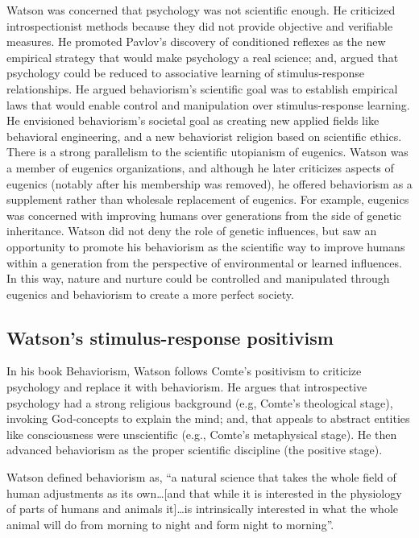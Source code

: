 \documentclass[
  oneside,
  12pt]{crumpbook}
\begin{document}
Watson was concerned that psychology was not scientific enough. He criticized introspectionist methods because they did not provide objective and verifiable measures. He promoted Pavlov's discovery of conditioned reflexes as the new empirical strategy that would make psychology a real science; and, argued that psychology could be reduced to associative learning of stimulus-response relationships. He argued behaviorism's scientific goal was to establish empirical laws that would enable control and manipulation over stimulus-response learning. He envisioned behaviorism's societal goal as creating new applied fields like behavioral engineering, and a new behaviorist religion based on scientific ethics. There is a strong parallelism to the scientific utopianism of eugenics. Watson was a member of eugenics organizations, and although he later criticizes aspects of eugenics (notably after his membership was removed), he offered behaviorism as a supplement rather than wholesale replacement of eugenics. For example, eugenics was concerned with improving humans over generations from the side of genetic inheritance. Watson did not deny the role of genetic influences, but saw an opportunity to promote his behaviorism as the scientific way to improve humans within a generation from the perspective of environmental or learned influences. In this way, nature and nurture could be controlled and manipulated through eugenics and behaviorism to create a more perfect society.

\hypertarget{watsons-stimulus-response-positivism}{%
\subsection{Watson's stimulus-response positivism}\label{watsons-stimulus-response-positivism}}

In his book Behaviorism, Watson follows Comte's positivism to criticize psychology and replace it with behaviorism. He argues that introspective psychology had a strong religious background (e.g, Comte's theological stage), invoking God-concepts to explain the mind; and, that appeals to abstract entities like consciousness were unscientific (e.g., Comte's metaphysical stage). He then advanced behaviorism as the proper scientific discipline (the positive stage).

Watson defined behaviorism as, ``a natural science that takes the whole field of human adjustments as its own\ldots{[}and that while it is interested in the physiology of parts of humans and animals it{]}\ldots is intrinsically interested in what the whole animal will do from morning to night and form night to morning''.
\end{document}
